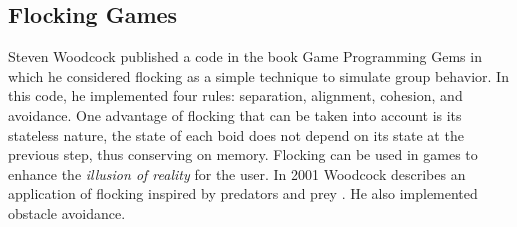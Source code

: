 \subsection{Flocking Games}
Steven Woodcock published a code in the book Game Programming Gems 
in which he considered flocking as a simple technique to simulate group 
behavior\cite{gems1}. 
In this code, he implemented four rules: separation, alignment, cohesion, 
and avoidance.  One advantage of flocking that can be taken into account is its
stateless nature, the state of each boid does not depend on its state at the previous
step, thus conserving on memory.  
Flocking can be used in games to enhance the \textit{illusion of reality} for the user. 
In 2001 Woodcock 
describes an application of flocking inspired by predators and prey \cite{gems2}. 
He also implemented obstacle avoidance.

